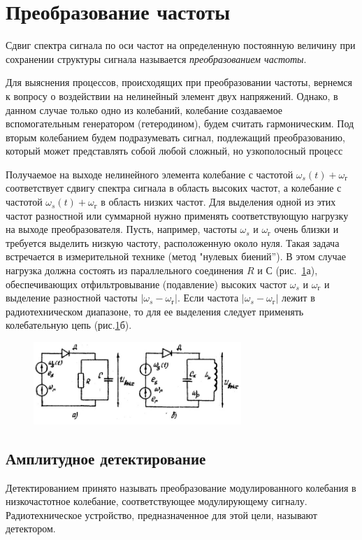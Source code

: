 \section{Преобразование частоты}
Сдвиг спектра сигнала по оси частот на определенную постоянную величину при сохранении структуры сигнала называется \textit{преобразованием частоты}.

Для выяснения процессов, происходящих при преобразовании частоты, вернемся к вопросу о воздействии на нелинейный элемент двух напряжений. Однако, в данном случае только одно из колебаний, колебание создаваемое вспомогательным генератором (гетеродином), будем считать гармоническим. Под вторым колебанием
будем подразумевать сигнал, подлежащий преобразованию, который может представлять собой любой сложный, но узкополосный процесс

Получаемое на выходе нелинейного элемента колебание с частотой $\omega_s(t)+\omega_{\text{г}}$ соответствует сдвигу спектра сигнала в область высоких частот, а колебание с частотой $\omega_s(t)+\omega_{\text{г}}$ в область низких частот. Для выделения одной из этих частот разностной или суммарной нужно применять соответствующую нагрузку на выходе преобразователя. Пусть, например, частоты $\omega_s$ и $\omega_{\text{г}}$ очень близки и требуется выделить низкую частоту, расположенную около нуля. Такая задача встречается в измерительной технике (метод "нулевых биений”). В этом случае нагрузка должна состоять из параллельного соединения $R$ и $С$ (рис.~\ref{pic:7}а), обеспечивающих отфильтровывание (подавление) высоких частот $\omega_s$ и $\omega_{\text{г}}$ и выделение разностной частоты $|\omega_s - \omega_{\text{г}}|$. Если частота	$|\omega_s - \omega_{\text{г}}|$ лежит в радиотехническом диапазоне, то для ее выделения следует применять колебательную цепь (рис.\ref{pic:7}б).
\begin{figure}[h!]
	\centering
	\includegraphics[width=0.7\textwidth]{picture/pic7.jpg}
	\caption{}
	\label{pic:7}
\end{figure}
\subsection{Амплитудное детектирование}
Детектированием принято называть преобразование модулированного колебания в
низкочастотное колебание, соответствующее модулирующему сигналу. Радиотехническое устройство, предназначенное для этой цели, называют детектором.


